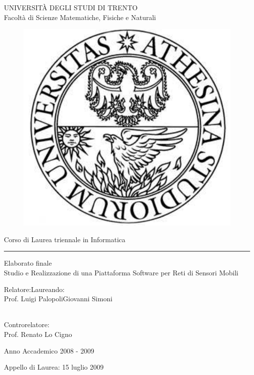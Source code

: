 \begin{titlepage}
\begin{center}
\LARGE{UNIVERSIT\`A DEGLI STUDI DI TRENTO\\}
\large{Facolt\`a di Scienze Matematiche, Fisiche e Naturali\\}
\begin{figure}[ht]
    \begin{center}
        \includegraphics[scale=0.25]{official/logo}
    \end{center}
\end{figure}
Corso di Laurea triennale in Informatica
\rule{\linewidth}{1pt}
\vspace*{15mm}
Elaborato finale\\
\vspace*{15mm}
\huge{Studio e Realizzazione di una Piattaforma
      Software per Reti di Sensori Mobili}
\end{center}
\vspace*{15mm}
\begin{flushleft}
Relatore:Laureando:\\
Prof. Luigi PalopoliGiovanni Simoni

\-\\
Controrelatore:\\
Prof. Renato Lo Cigno
\end{flushleft}
\vspace*{4cm}
\normalsize
\begin{center}
Anno Accademico 2008 - 2009

Appello di Laurea: 15 luglio 2009
\end{center}
\cleardoublepage
\end{titlepage}
